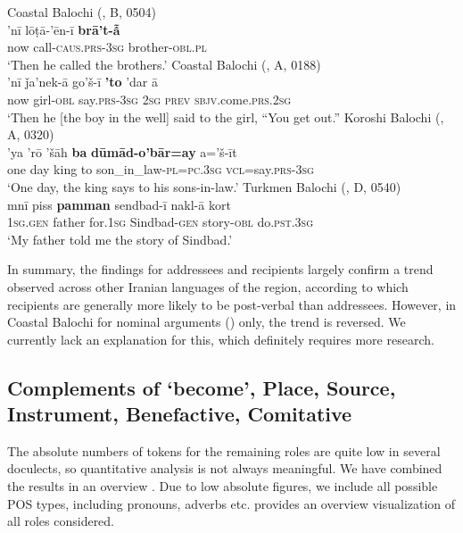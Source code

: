 \documentclass[output=paper,colorlinks,citecolor=brown,draftmode]{langscibook}
\begin{document}
\ea\label{Balochi:ex:19}
\ea\label{Balochi:ex:19a}
Coastal Balochi (\citealt{nourzaei_balochi_coastal_2021}, B, 0504) \\
\gll 'nī lōṭā-'ēn-ī \textbf{brā't-ẫ} \\
now call-\textsc{caus}.\textsc{prs}-\textsc{3sg} brother-\textsc{obl}.\textsc{pl} \\
\glt `{T}hen he called the brothers.' 
\newpage
\ex\label{Balochi:ex:19b}
Coastal Balochi (\citealt{nourzaei_balochi_coastal_2021}, A, 0188)\\
\gll 'nī ǰa'nek-ā go'š-ī \textbf{'to} 'dar ā \\
now girl-\textsc{obl} say.\textsc{prs}-\textsc{3sg} \textsc{2sg} \textsc{prev} \textsc{sbjv}.come.\textsc{prs}.\textsc{2sg} \\
\glt `{T}hen he [the boy in the well] said to the girl, ``You get out.'' 
\ex\label{Balochi:ex:19c}
Koroshi Balochi (\citealt{nourzaei_balochi_koroshi_2021}, A, 0320)\\
\gll 'ya 'rō 'šāh \textbf{ba} \textbf{dūmād-o'bār=ay} a='š-īt \\
one day king to son\_in\_law-\textsc{pl}=\textsc{pc}.\textsc{3sg} \textsc{vcl}=say.\textsc{prs}-\textsc{3sg} \\
\glt `{O}ne day, the king says to his sons-in-law.' 
\ex\label{Balochi:ex:19d}
Turkmen Balochi (\citealt{haig_balochi_2022}, D, 0540)\\
\gll mnī piss \textbf{pamman} sendbad-ī nakl-ā kort \\
\textsc{1sg}.\textsc{gen} father for.\textsc{1sg} Sindbad-\textsc{gen} story-\textsc{obl} do.\textsc{pst}.\textsc{3sg} \\
\glt `{M}y father told me the story of Sindbad.'
\z
\z

In summary, the findings for addressees and recipients largely confirm a trend observed across other Iranian languages of the region, according to which recipients are generally more likely to be post-verbal than addressees. However, in Coastal Balochi for nominal arguments () only, the trend is reversed. We currently lack an explanation for this, which definitely requires more research.

\subsection{Complements of `become', Place, Source, Instrument, Benefactive, Comitative}\label{Balochi:ss:4.5}
\largerpage
The absolute numbers of tokens for the remaining roles are quite low in several doculects, so quantitative analysis is not always meaningful. We have combined the results in an overview . Due to low absolute figures, we include all possible POS types, including pronouns, adverbs etc.  provides an overview visualization of all roles considered.
\end{document}
